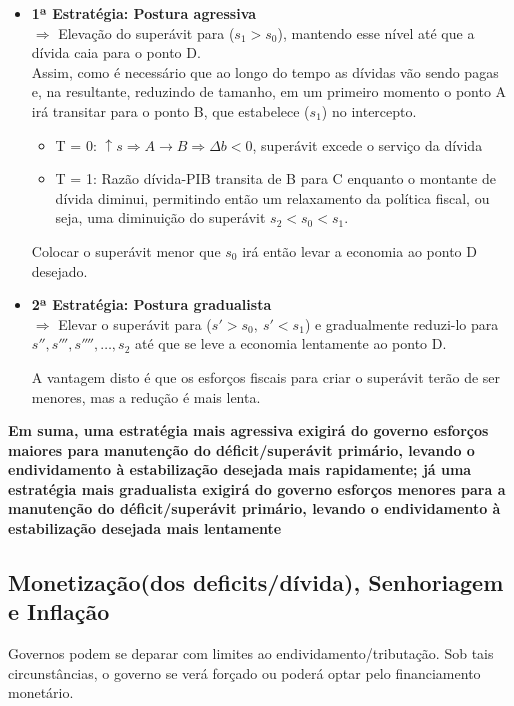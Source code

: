 \documentclass[a4paper,12pt]{article}[abntex2]
\begin{document}
\begin{itemize}
    \item \textbf{1ª Estratégia: Postura agressiva} \\
    \(\Rightarrow\) Elevação do superávit para (\(s_1 > s_0\)), mantendo esse nível até que a dívida caia para o ponto D. \\
    Assim, como é necessário que ao longo do tempo as dívidas vão sendo pagas e, na resultante, reduzindo de tamanho, em um primeiro momento o ponto A irá transitar para o ponto B, que estabelece (\(s_1\)) no intercepto.
    
    \begin{itemize}
        \item T = 0: \(\uparrow s \Rightarrow A \rightarrow B \Rightarrow \Delta b < 0\), superávit excede o serviço da dívida
        \item T = 1: Razão dívida-PIB transita de B para C enquanto o montante de dívida diminui, permitindo então um relaxamento da política fiscal, ou seja, uma diminuição do superávit \(s_2 < s_0 < s_1\).
    \end{itemize}

    Colocar o superávit menor que \(s_0\) irá então levar a economia ao ponto D desejado.

    \item \textbf{2ª Estratégia: Postura gradualista} \\
    \(\Rightarrow\) Elevar o superávit para (\(s' > s_0, \ s' < s_1\)) e gradualmente reduzi-lo para \(s'', s''', s'''', \dots, s_2\) até que se leve a economia lentamente ao ponto D.

    A vantagem disto é que os esforços fiscais para criar o superávit terão de ser menores, mas a redução é mais lenta.
\end{itemize}

\textbf{Em  suma,  uma  estratégia  mais  agressiva  exigirá  do  governo  esforços  maiores  para manutenção do déficit/superávit primário, levando o endividamento à estabilização desejada mais rapidamente; já uma estratégia mais gradualista exigirá do governo esforços menores para a manutenção do déficit/superávit primário, levando o endividamento à estabilização desejada mais lentamente}

\subsection{\textbf{Monetização(dos deficits/dívida), Senhoriagem e Inflação}}
Governos podem se deparar com limites ao endividamento/tributação.  
Sob tais circunstâncias, o governo se verá forçado ou poderá optar pelo financiamento monetário.
\end{document}
